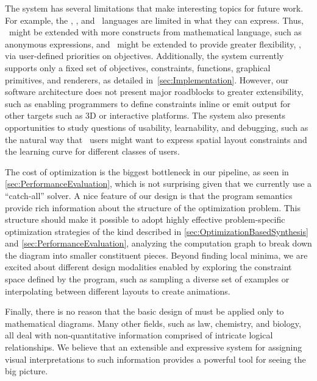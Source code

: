 The system has several limitations that make interesting topics for future work. For example, the \Domain, \Substance, and \Style\ languages are limited in what they can express. Thus, \Substance\ might be extended with more constructs from mathematical language, such as anonymous expressions, and \Style\ might be extended to provide greater flexibility, \eg{}, via user-defined priorities on objectives. Additionally, the system currently supports only a fixed set of objectives, constraints, functions, graphical primitives, and renderers, as detailed in~\cref{sec:Implementation}. However, our software architecture does not present major roadblocks to greater extensibility, such as enabling programmers to define constraints inline or emit output for other targets such as 3D or interactive platforms. The system also presents opportunities to study questions of usability, learnability, and debugging, such as the natural way that \Style\ users might want to express spatial layout constraints and the learning curve for different classes of users. 

The cost of optimization is the biggest bottleneck in our pipeline, as seen in \cref{sec:PerformanceEvaluation}, which is not surprising given that we currently use a ``catch-all'' solver.  A nice feature of our design is that the program semantics provide rich information about the structure of the optimization problem.  This structure should make it possible to adopt highly effective problem-specific optimization strategies of the kind described in \cref{sec:OptimizationBasedSynthesis} and \cref{sec:PerformanceEvaluation}, \eg{} analyzing the computation graph to break down the diagram into smaller constituent pieces.  Beyond finding local minima, we are excited about different design modalities enabled by exploring the constraint space defined by the \Style{} program, such as sampling a diverse set of examples or interpolating between different layouts to create animations.

Finally, there is no reason that the basic design of \Penrose{} must be applied only to mathematical diagrams. Many other fields, such as law, chemistry, and biology, all deal with non-quantitative information comprised of intricate logical relationships.  We believe that an extensible and expressive system for assigning visual interpretations to such information provides a powerful tool for seeing the big picture.



